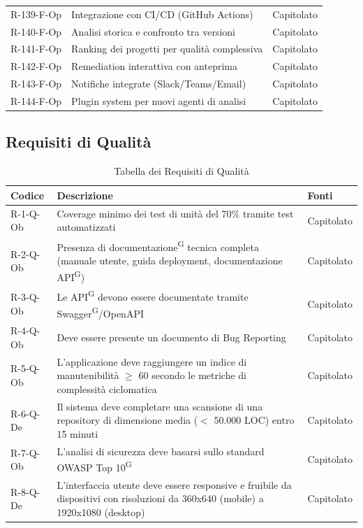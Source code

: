 \documentclass[a4paper, 11pt]{article}
\renewcommand{\arraystretch}{1.4} %
\begin{document}
\begin{longtable}[c]{ >{\centering\arraybackslash}m{2.5cm} >{\centering\arraybackslash}m{8.3cm} >{\centering\arraybackslash}m{3.5cm} }
    R-139-F-Op & Integrazione con CI/CD (GitHub Actions) & Capitolato\\
    R-140-F-Op & Analisi storica e confronto tra versioni & Capitolato\\
    R-141-F-Op & Ranking dei progetti per qualità complessiva & Capitolato\\
    R-142-F-Op & Remediation interattiva con anteprima & Capitolato\\
    R-143-F-Op & Notifiche integrate (Slack/Teams/Email) & Capitolato\\
    R-144-F-Op & Plugin system per nuovi agenti di analisi & Capitolato\\
\end{longtable}

\subsection{Requisiti di Qualità}
\renewcommand{\arraystretch}{1.5}
\begin{longtable}[c]{ >{\centering\arraybackslash}m{2.5cm} >{\centering\arraybackslash}m{8.3cm} >{\centering\arraybackslash}m{3.5cm} }
    \caption{Tabella dei Requisiti di Qualità} \\
    \rowcolor{AccentDark}
    \color{white}\textbf{Codice} & \color{white}\textbf{Descrizione} & \color{white}\textbf{Fonti} \\
    \endhead
    R-1-Q-Ob & Coverage minimo dei test di unità del 70\% tramite test automatizzati & Capitolato \\
    R-2-Q-Ob & Presenza di documentazione\textsuperscript{G} tecnica completa (manuale utente, guida deployment, documentazione API\textsuperscript{G}) & Capitolato \\
    R-3-Q-Ob & Le API\textsuperscript{G} devono essere documentate tramite Swagger\textsuperscript{G}/OpenAPI & Capitolato \\
    R-4-Q-Ob & Deve essere presente un documento di Bug Reporting & Capitolato \\
    R-5-Q-Ob & L'applicazione deve raggiungere un indice di manutenibilità $\geq$ 60 secondo le metriche di complessità ciclomatica & Capitolato \\
    R-6-Q-De & Il sistema deve completare una scansione di una repository di dimensione media ($<$ 50.000 LOC) entro 15 minuti & Capitolato \\
    R-7-Q-Ob & L'analisi di sicurezza deve basarsi sullo standard OWASP Top 10\textsuperscript{G} & Capitolato \\
    R-8-Q-De & L'interfaccia utente deve essere responsive e fruibile da dispositivi con risoluzioni da 360x640 (mobile) a 1920x1080 (desktop) & Capitolato \\
\end{longtable}
\end{document}
